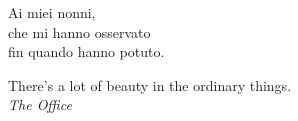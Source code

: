 \cleardoublepage
    \thispagestyle{empty}
		{\large
            \begin{flushright}
				Ai miei nonni,\\
				che mi hanno osservato\\
				fin quando hanno potuto.\\
				\vspace{2em}

				There's a lot of beauty in the ordinary things.\\
				\textit{The Office}

            \end{flushright}
		}
\cleardoublepage